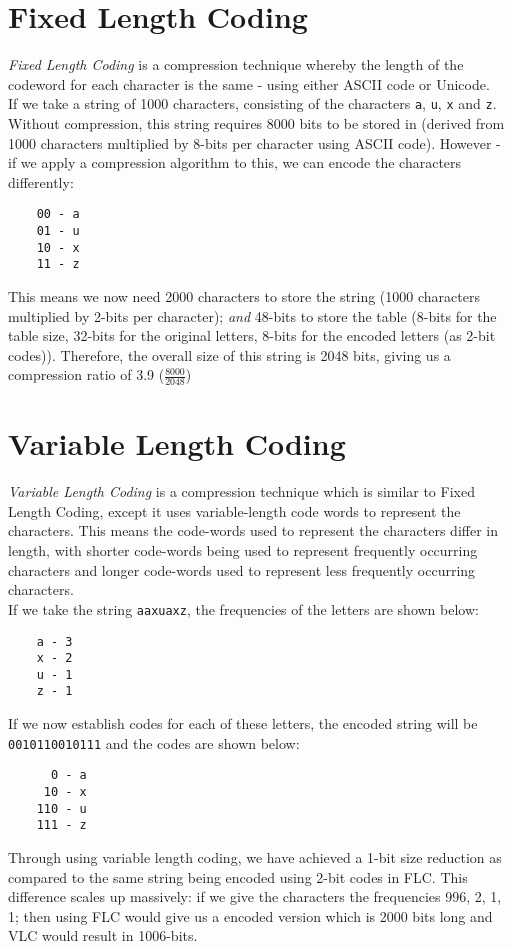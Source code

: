 \section{Fixed Length Coding}
\textit{Fixed Length Coding} is a compression technique whereby the length of the codeword for each character is the same - using either ASCII code or Unicode. \\

If we take a string of 1000 characters, consisting of the characters \verb|a|, \verb|u|, \verb|x| and \verb|z|. Without compression, this string requires 8000 bits to be stored in (derived from 1000 characters multiplied by 8-bits per character using ASCII code). However - if we apply a compression algorithm to this, we can encode the characters differently:
\begin{verbatim}
    00 - a
    01 - u
    10 - x
    11 - z
\end{verbatim} 
This means we now need 2000 characters to store the string (1000 characters multiplied by 2-bits per character); \textit{and} 48-bits to store the table (8-bits for the table size, 32-bits for the original letters, 8-bits for the encoded letters (as 2-bit codes)). Therefore, the overall size of this string is 2048 bits, giving us a compression ratio of 3.9 ($\displaystyle \frac{8000}{2048}$)

\section{Variable Length Coding}
\textit{Variable Length Coding} is a compression technique which is similar to Fixed Length Coding, except it uses variable-length code words to represent the characters. This means the code-words used to represent the characters differ in length, with shorter code-words being used to represent frequently occurring characters and longer code-words used to represent less frequently occurring characters.\\

If we take the string \verb|aaxuaxz|, the frequencies of the letters are shown below:
\begin{verbatim}
    a - 3
    x - 2
    u - 1
    z - 1
\end{verbatim}
If we now establish codes for each of these letters, the encoded string will be \verb|0010110010111| and the codes are shown below:
\begin{verbatim}
      0 - a
     10 - x
    110 - u
    111 - z
\end{verbatim}
Through using variable length coding, we have achieved a 1-bit size reduction as compared to the same string being encoded using 2-bit codes in FLC. This difference scales up massively: if we give the characters the frequencies 996, 2, 1, 1; then using FLC would give us a encoded version which is 2000 bits long and VLC would result in 1006-bits.\\

